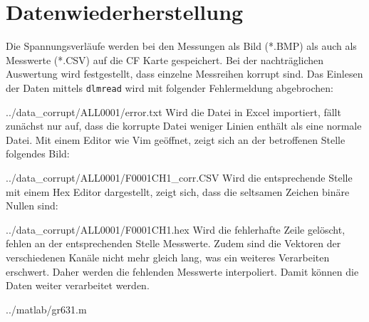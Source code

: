 \section{Datenwiederherstellung}
Die Spannungsverläufe werden bei den Messungen als Bild (*.BMP) als auch als 
Messwerte (*.CSV) auf die CF Karte gespeichert. Bei der nachträglichen 
Auswertung wird festgestellt, dass einzelne Messreihen korrupt sind. 
Das Einlesen der Daten mittels \verb!dlmread! wird mit folgender Fehlermeldung 
abgebrochen: 

{../data_corrupt/ALL0001/error.txt}
Wird die Datei in Excel importiert, fällt zunächst nur auf, dass die korrupte 
Datei weniger Linien enthält als eine normale Datei. Mit einem Editor wie Vim 
geöffnet, zeigt sich an der betroffenen Stelle folgendes Bild: 

{../data_corrupt/ALL0001/F0001CH1_corr.CSV}
\clearpage
Wird die entsprechende Stelle mit einem Hex Editor dargestellt, zeigt sich, 
dass die seltsamen Zeichen binäre Nullen sind: 

{../data_corrupt/ALL0001/F0001CH1.hex}
Wird die fehlerhafte Zeile gelöscht, fehlen an der entsprechenden Stelle 
Messwerte. Zudem sind die Vektoren der verschiedenen Kanäle nicht mehr gleich 
lang, was ein weiteres Verarbeiten erschwert. Daher werden die fehlenden 
Messwerte interpoliert. Damit können die Daten weiter verarbeitet werden. 

{../matlab/gr631.m}

